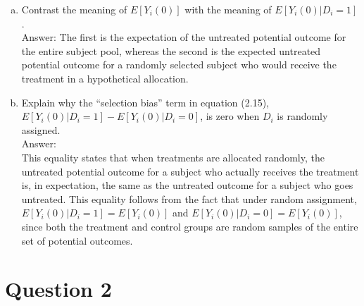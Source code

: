 \documentclass[11pt,notitlepage]{article}\usepackage[]{graphicx}\usepackage[]{color}
\makeatletter
\newenvironment{kframe}{%
 \def\at@end@of@kframe{}%
 \ifinner\ifhmode%
  \def\at@end@of@kframe{\end{minipage}}%
  \begin{minipage}{\columnwidth}%
 \fi\fi%
 \def\FrameCommand##1{\hskip\@totalleftmargin \hskip-\fboxsep
 \colorbox{shadecolor}{##1}\hskip-\fboxsep
     \hskip-\linewidth \hskip-\@totalleftmargin \hskip\columnwidth}%
 \MakeFramed {\advance\hsize-\width
   \@totalleftmargin\z@ \linewidth\hsize
   \@setminipage}}%
 {\par\unskip\endMakeFramed%
 \at@end@of@kframe}
\newenvironment{knitrout}{}{} %
\makeatother
\begin{document}
\begin{enumerate}[a)]
\item Contrast the meaning of $E[Y_i(0)]$ with the meaning of $E[Y_i(0) | D_{i}=1]$.\\
Answer: The first is the expectation of the untreated potential outcome for the entire subject pool, whereas the second is the expected untreated potential outcome for a randomly selected subject who would receive the treatment in a hypothetical allocation.

\item Explain why the ``selection bias'' term in equation (2.15), $E[Y_{i}(0)|D_{i}=1]-E[Y_{i}(0)|D_{i}=0]$, is zero when $D_{i}$ is randomly assigned. \\
Answer:\\
This equality states that when treatments are allocated randomly, the untreated potential outcome for a subject who actually receives the treatment is, in expectation, the same as the untreated outcome for a subject who goes untreated.  This equality follows from the fact that under random assignment, $E[Y_{i}(0)|D_{i}=1]=E[Y_{i}(0)]$ and $E[Y_{i}(0)|D_{i}=0]=E[Y_{i}(0)]$, since both the treatment and control groups are random samples of the entire set of potential outcomes.

\end{enumerate}

\section*{Question 2}
\begin{knitrout}
\color{fgcolor}\begin{kframe}
\begin{verbatim}





\end{verbatim}
\end{kframe}
\end{knitrout}
\end{document}
